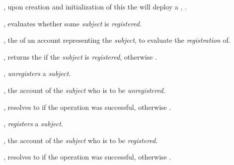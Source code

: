 \begin{code}
  \begin{constructor}
    \item {}, upon creation and initialization of this
       the  will deploy a ,
      .
  \end{constructor}

  \begin{functions}
    \item {}, evaluates whether some
      \emph{subject} is \emph{registered}.

      \begin{parameters}
        \item {}, the  of an account
          representing the \emph{subject}, to evaluate the \emph{registration}
          of.
      \end{parameters}

      \begin{returns}
        \item {}, returns the  if the
          \emph{subject} is \emph{registered}, otherwise .
      \end{returns}

    \item {}, \emph{unregisters} a
      \emph{subject}.

      \begin{parameters}
        \item {}, the account  of the
          \emph{subject} who is to be \emph{unregistered}.
      \end{parameters}

      \begin{returns}
        \item {}, resolves to  if the operation was
          successful, otherwise .
      \end{returns}

    \item {}, \emph{registers} a
      \emph{subject}.

      \begin{parameters}
        \item {}, the account  of the
          \emph{subject} who is to be \emph{registered}.
      \end{parameters}

      \begin{returns}
        \item {}, resolves to  if the operation was
          successful, otherwise .
      \end{returns}
  \end{functions}
\end{code}
